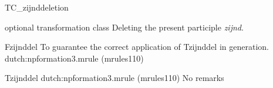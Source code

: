 \begin{mruleclass}{TC\_zijnddeletion}
\begin{classdescr}
\kind optional transformation class
\classtask Deleting the present participle {\em zijnd}.
\classremarks
\begin{filters}
\begin{members}
\begin{member}
 Fzijnddel
 To guarantee the correct application of Tzijnddel in 
generation.
\file dutch:npformation3.mrule (mrules110)
\end{member}
\end{members}
\end{filters}
\nospeedrules
\noplannedrules
\norulesnotince
\begin{comments}
\end{comments}
\end{classdescr}

\begin{members}
\begin{member}
 Tzijnddel
\file dutch:npformation3.mrule (mrules110)
\semantics \nosemantics
\example
\remarks No remarks
\end{member}
\end{members}

\end{mruleclass}

